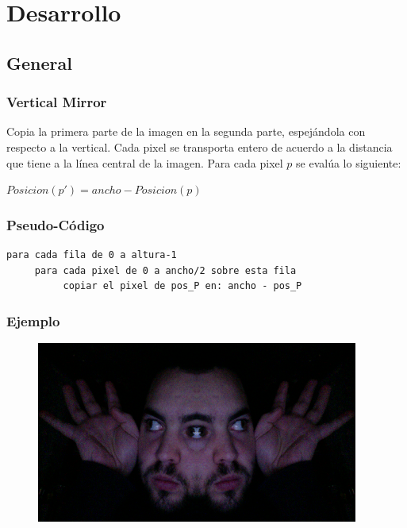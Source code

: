 \section{Desarrollo}
  
\subsection{General}

\subsubsection{Vertical Mirror}

Copia la primera parte de la imagen en la segunda parte, espej\'andola con respecto a la vertical. Cada pixel se transporta entero de acuerdo a la distancia que tiene a la l\'inea central de la imagen. Para cada pixel $p$ se eval\'ua lo siguiente:\\
\begin{center}
$Posicion(p') = ancho - Posicion (p)$
\end{center}
\subsubsection*{Pseudo-C\'odigo}
\begin{verbatim}
para cada fila de 0 a altura-1
     para cada pixel de 0 a ancho/2 sobre esta fila
          copiar el pixel de pos_P en: ancho - pos_P
\end{verbatim}
\subsubsection*{Ejemplo}
\begin{center}
  \begin{figure}[H]
  \includegraphics[scale=0.60]{imgs/vmirr.png}
  \end{figure}  
\end{center}

